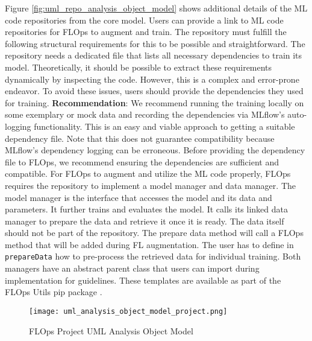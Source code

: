 Figure \ref{fig:uml_repo_analysis_object_model} shows additional details of the ML code repositories from the core model.
Users can provide a link to ML code repositories for FLOps to augment and train.
The repository must fulfill the following structural requirements for this to be possible and straightforward.
The repository needs a dedicated file that lists all necessary dependencies to train its model.
Theoretically, it should be possible to extract these requirements dynamically by inspecting the code.
However, this is a complex and error-prone endeavor.
To avoid these issues, users should provide the dependencies they used for training.
\vspace{5mm}
\newline
\textbf{Recommendation}: We recommend running the training locally on some exemplary or mock data and recording the dependencies via MLflow's auto-logging functionality.
This is an easy and viable approach to getting a suitable dependency file.
Note that this does not guarantee compatibility because MLflow's dependency logging can be erroneous.
Before providing the dependency file to FLOps, we recommend ensuring the dependencies are sufficient and compatible.
\vspace{5mm}
\newline
For FLOps to augment and utilize the ML code properly, FLOps requires the repository to implement a model manager and data manager.
The model manager is the interface that accesses the model and its data and parameters.
It further trains and evaluates the model.
It calls its linked data manager to prepare the data and retrieve it once it is ready.
The data itself should not be part of the repository.
The prepare data method will call a FLOps method that will be added during FL augmentation.
The user has to define in \texttt{prepareData} how to pre-process the retrieved data for individual training.
Both managers have an abstract parent class that users can import during implementation for guidelines.
These templates are available as part of the FLOps Utils pip package \cite{flops_utils_pip}.

\begin{figure}[t]
    \centering
    \texttt{[image: uml\_analysis\_object\_model\_project.png]}
    \caption{FLOps Project UML Analysis Object Model}
    \label{fig:uml_project_analysis_object_model}
\end{figure}

